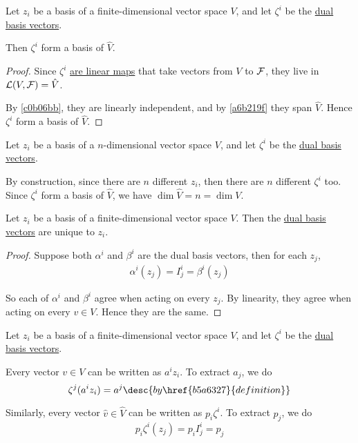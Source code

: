 \cvn Let $z_i$ be a basis of a finite-dimensional vector space $V$, and let
$\zeta^i$ be the \href{b5a6327}{dual basis vectors}.

Then $\zeta^i$ form a basis of $\hat V$.

\begin{proof}
  Since $\zeta^i$ \href{a484f61}{are linear maps} that take vectors from $V$ to
  $\mathcal F$, they live in $\mathcal L(V,\mathcal F)=\hat V$.

  By \autoref{c0b06bb}, they are linearly independent, and by \autoref{a6b219f}
  they span $\hat V$. Hence $\zeta^i$ form a basis of $\hat V$.
\end{proof}

\label{a36df48}

\cvn Let $z_i$ be a basis of a $n$-dimensional vector space $V$, and let
$\zeta^i$ be the \href{b5a6327}{dual basis vectors}.

By construction, since there are $n$ different $z_i$, then there are $n$
different $\zeta^i$ too. Since $\zeta^i$ form a basis of $\hat V$, we have
$\dim\hat V=n=\dim V$.

\label{f7fa762}

\cvn Let $z_i$ be a basis of a finite-dimensional vector space $V$. Then the
\href{b5a6327}{dual basis vectors} are unique to $z_i$.

\begin{proof}
  Suppose both  $\alpha^i$ and $\beta^i$ are the dual basis vectors, then for
  each $z_j$,
  \begin{align*}
    \alpha^i(z_j)=I^i_j=\beta^i(z_j)
  \end{align*}

  So each of $\alpha^i$ and $\beta^i$ agree when acting on every $z_j$. By
  linearity, they agree when acting on every $v\in V$. Hence they are the same.
\end{proof}

\label{f1ba086}

\cvn Let $z_i$ be a basis of a finite-dimensional vector space $V$, and let
$\zeta^i$ be the \href{b5a6327}{dual basis vectors}.

Every vector $v\in V$ can be written as $a^iz_i$. To extract $a_j$, we do
$$
  \zeta^j(a^iz_i)=a^j\desc{by \href{b5a6327}{definition}}
$$

Similarly, every vector $\hat v\in\hat V$ can be written as $p_i\zeta^i$. To
extract $p_j$, we do
$$
  p_i\zeta^i(z_j)=p_iI^i_j=p_j
$$

